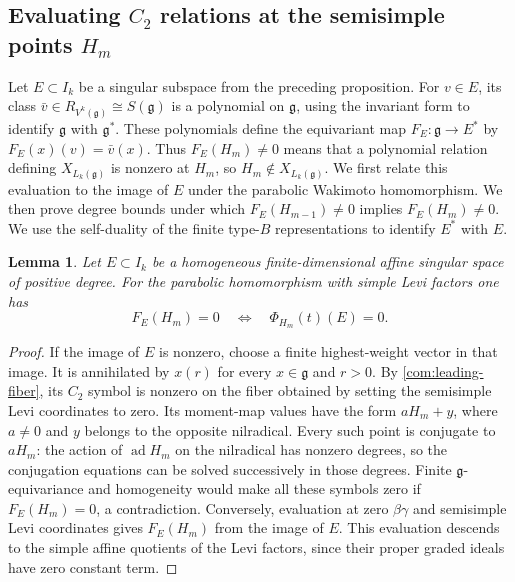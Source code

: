 \documentclass[11pt,a4paper]{amsart}
\numberwithin{equation}{section}
\newtheorem{lemma}[theorem]{Lemma}
\theoremstyle{definition}
\theoremstyle{remark}
\newcommand{\g}{\mathfrak g}
\newcommand{\ad}{\operatorname{ad}}
\begin{document}
\subsection{\texorpdfstring{Evaluating $C_2$ relations at the semisimple points $H_m$}{Evaluating C2 relations at the semisimple points H(m)}}\label{B:covariant-restriction}
Let $E\subset I_k$ be a singular subspace from the preceding proposition.
For $v\in E$, its class $\bar v\in R_{V^k(\g)}\cong S(\g)$ is a
polynomial on $\g$, using the invariant form to identify $\g$ with
$\g^*$. These polynomials define the equivariant map
$F_E:\g\to E^*$ by $F_E(x)(v)=\bar v(x)$.
Thus $F_E(H_m)\ne0$ means that a polynomial relation defining
$X_{L_k(\g)}$ is nonzero at $H_m$, so $H_m\notin X_{L_k(\g)}$.
We first relate this evaluation to the image of $E$ under the parabolic
Wakimoto homomorphism. We then prove degree bounds under which
$F_E(H_{m-1})\ne0$ implies $F_E(H_m)\ne0$.
We use the self-duality of the finite type-$B$ representations to
identify $E^*$ with $E$.
\begin{lemma}\label{B:singular-detection}
Let $E\subset I_k$ be a homogeneous finite-dimensional affine singular
space of positive degree. For the parabolic homomorphism with simple
Levi factors one has
$$
 F_E(H_m)=0\quad\Longleftrightarrow\quad
 \Phi_{H_m}(t)(E)=0.
$$
\end{lemma}
\begin{proof}
If the image of $E$ is nonzero, choose a finite highest-weight vector
in that image. It is annihilated by $x(r)$ for every $x\in\g$ and $r>0$.
By \cref{com:leading-fiber}, its $C_2$ symbol is nonzero on the fiber
obtained by setting the semisimple Levi coordinates to zero. Its moment-map values have the form
$aH_m+y$, where $a\ne0$ and $y$ belongs to the opposite nilradical.
Every such point is conjugate to $aH_m$: the action of
$\ad H_m$ on the nilradical has nonzero degrees, so the
conjugation equations can be solved successively in those degrees.
Finite $\g$-equivariance and homogeneity would make all these symbols
zero if $F_E(H_m)=0$, a contradiction. Conversely, evaluation at zero
$\beta\gamma$ and semisimple Levi coordinates gives $F_E(H_m)$ from the
image of $E$. This evaluation descends to the simple affine quotients
of the Levi factors, since their proper graded ideals have zero constant term.
\end{proof}
\end{document}
